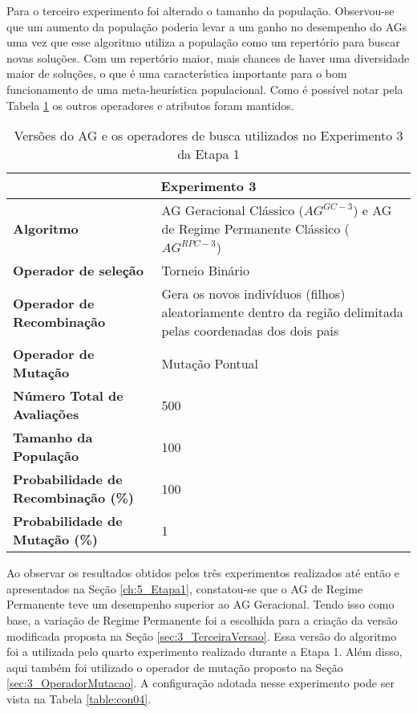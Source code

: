 Para o terceiro experimento foi alterado o tamanho da população. Observou-se que um  aumento da população  poderia levar a um ganho no desempenho do AGs uma vez que esse algoritmo utiliza a população como um repertório para buscar novas soluções. Com um repertório maior, mais chances de haver uma diversidade maior de soluções, o que é uma característica importante para o bom funcionamento de uma meta-heurística populacional. Como é possível notar pela Tabela \ref{table:con03} os outros operadores e atributos foram mantidos.
\begin{table}[!htbp]
\centering
\caption{Versões do AG e os operadores de busca utilizados no Experimento 3 da Etapa 1}
\label{table:con03}
\begin{tabular}{|p{6cm}|p{9cm}|}
\hline

\multicolumn{2}{|c|}{\textbf{Experimento 3}} \\ \hline
\textbf{Algoritmo} & AG Geracional Clássico ($AG^{GC-3}$) e AG de Regime Permanente Clássico ($AG^{RPC-3}$) \\ \hline
\textbf{Operador de seleção} & Torneio Binário \\ \hline
\textbf{Operador de Recombinação} & Gera os novos indivíduos (filhos) aleatoriamente dentro da região delimitada pelas coordenadas dos dois pais \\  \hline
\textbf{Operador de Mutação} & Mutação Pontual \\ \hline
\textbf{Número Total de Avaliações} & 500 \\ \hline
\textbf{Tamanho da População} & 100 \\ \hline
\textbf{Probabilidade de Recombinação (\%)} & 100 \\ \hline
\textbf{Probabilidade de Mutação (\%)} & 1 \\ \hline
 \end{tabular}
\end{table}

Ao observar os resultados obtidos pelos três experimentos realizados até então e apresentados na Seção \ref{ch:5_Etapa1}, constatou-se que o AG de Regime Permanente teve um desempenho superior ao AG Geracional. Tendo isso como base, a variação de Regime Permanente foi a escolhida para a criação da versão modificada proposta na Seção \ref{sec:3_TerceiraVersao}. Essa versão do algoritmo foi a utilizada pelo quarto experimento realizado durante a Etapa 1. Além disso, aqui também foi utilizado o operador de mutação proposto na Seção \ref{sec:3_OperadorMutacao}. A configuração adotada nesse experimento pode ser vista na Tabela \ref{table:con04}.

